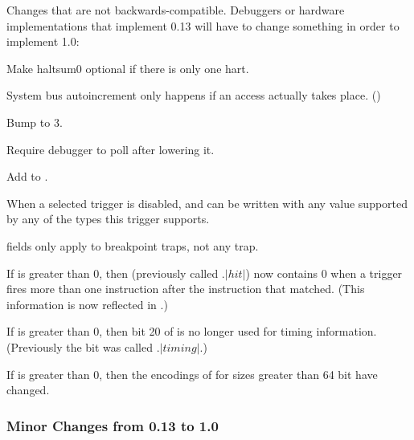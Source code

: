 \begin{steps}{Changes that are not backwards-compatible. Debuggers or
hardware implementations that implement 0.13 will have to change something in
order to implement 1.0:}
    \item Make haltsum0 optional if there is only one hart. 
    \item System bus autoincrement only happens if an access actually
    takes place. (\RdmSbdataZero) 
    \item Bump \FdmDmstatusVersion to 3. 
    \item Require debugger to poll \FdmDmcontrolDmactive after lowering it. 
    \item Add \FcsrIcountPending to \RcsrIcount. 
    \item When a selected trigger is disabled, \RcsrTdataTwo and \RcsrTdataThree
    can be written with any value supported by any of the types this trigger
    supports. 
    \item \RcsrTcontrol fields only apply to breakpoint traps, not any trap. 
    \item If \FcsrTinfoVersion is greater than 0, then \FcsrMcontrolSixHitZero
        (previously called \RcsrMcontrolSix.$|hit|$) now contains 0 when a trigger
        fires more than one instruction after the instruction that matched.  (This
        information is now reflected in \FcsrMcontrolSixHitOne.) 
    \item If \FcsrTinfoVersion is greater than 0, then bit 20 of
        \RcsrMcontrolSix is no longer used for timing information. (Previously
        the bit was called \RcsrMcontrolSix.$|timing|$.) 
    \item If \FcsrTinfoVersion is greater than 0, then the encodings of
        \FcsrMcontrolSixSize for sizes greater than 64 bit have changed. 
\end{steps}

\subsubsection{Minor Changes from 0.13 to 1.0}

